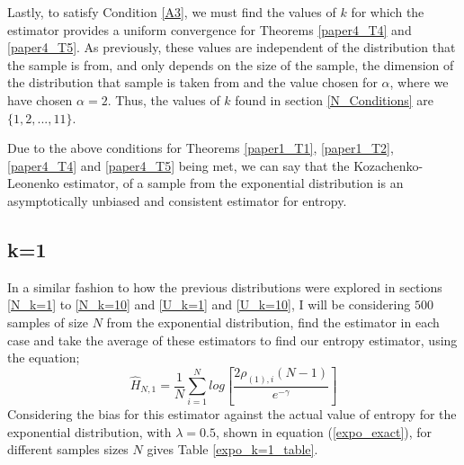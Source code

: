 \documentclass{report}
\begin{document}
Lastly, to satisfy Condition \ref{A3}, we must find the values of $k$ for which the estimator provides a uniform convergence for Theorems \ref{paper4_T4} and \ref{paper4_T5}. As previously, these values are independent of the distribution that the sample is from, and only depends on the size of the sample, the dimension of the distribution that sample is taken from and the value chosen for $\alpha$, where we have chosen $\alpha = 2$. Thus, the values of $k$ found in section \ref{N_Conditions} are $\{1, 2, ..., 11\}$.

Due to the above conditions for Theorems \ref{paper1_T1}, \ref{paper1_T2}, \ref{paper4_T4} and \ref{paper4_T5} being met, we can say that the Kozachenko-Leonenko estimator, of a sample from the exponential distribution is an asymptotically unbiased and consistent estimator for entropy. 




\subsection{k=1} \label{E_k=1}
In a similar fashion to how the previous distributions were explored in sections \ref{N_k=1} to \ref{N_k=10} and \ref{U_k=1} and \ref{U_k=10}, I will be considering $500$ samples of size $N$ from the exponential distribution, find the estimator in each case and take the average of these estimators to find our entropy estimator, using the equation;
\begin{equation}
\hat{H}_{N, 1} = \frac{1}{N} \sum_{i=1}^{N} log \left[ \frac{2\rho_{(1),i} (N-1)}{e^{-\gamma}} \right] \nonumber
\end{equation}
Considering the bias for this estimator against the actual value of entropy for the exponential distribution, with $\lambda =0.5$, shown in equation (\ref{expo_exact}), for different samples sizes $N$ gives Table \ref{expo_k=1_table}.
\end{document}
